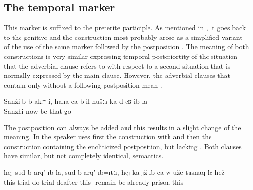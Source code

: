 
\subsection{The temporal marker  }
\label{sec:temporal marker -la}

This marker is suffixed to the preterite participle. As mentioned in , it goes back to the genitive and the construction most probably arose as a simplified variant of the use of the same marker followed by the postposition . The meaning of both constructions is very similar expressing temporal posteriortity of the situation that the adverbial clause refers to with respect to a second situation that is normally expressed by the main clause. However, the adverbial clauses that contain only  without a following postposition mean .
%
\begin{exe}
	\ex	\label{ex:‎In Sanzhi there was no (such plant), now there is, since we moved here}
	\gll	Sanži-b	b-akːʷ-i,	hana	ca-b	il	nušːa	ka-d-eʁ-ib-la\\
		Sanzhi		now	be	that		go\\
	\glt	{}
\end{exe}

The postposition can always be added and this results in a slight change of the meaning. In  the speaker uses first the construction with  and then the construction containing the encliticized postposition, but lacking . Both clauses have similar, but not completely identical, semantics. 
%
\begin{exe}
	\ex	\label{ex:Since the trial, after the trial was made, he is already sitting in prison}
	\gll	hej	sud	b-arq'-ib-la,	sud	b-arq'-ib=itːi,	hej	ka-jž-ib	ca-w	uže	tusnaq-le	hež\\
		this	trial	do	trial	doafter	this	-remain	be	already	prison	this\\
	\glt	{}
\end{exe}

